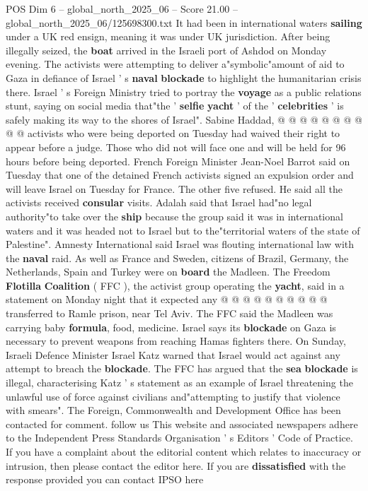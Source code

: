 \begin{textsample}{POS Dim 6 – global\_north\_2025\_06 – Score 21.00 – global\_north\_2025\_06/125698300.txt}
It had been in international waters \textbf{sailing} under a UK red ensign, meaning it was under UK jurisdiction.
After being illegally seized, the \textbf{boat} arrived in the Israeli port of Ashdod on Monday evening.
The activists were attempting to deliver a"symbolic"amount of aid to Gaza in defiance of Israel ' s \textbf{naval} \textbf{blockade} to highlight the humanitarian crisis there.
Israel ' s Foreign Ministry tried to portray the \textbf{voyage} as a public relations stunt, saying on social media that"the ' \textbf{selfie} \textbf{yacht} ' of the ' \textbf{celebrities} ' is safely making its way to the shores of Israel".
Sabine Haddad, @ @ @ @ @ @ @ @ @ @ activists who were being deported on Tuesday had waived their right to appear before a judge.
Those who did not will face one and will be held for 96 hours before being deported.
French Foreign Minister Jean-Noel Barrot said on Tuesday that one of the detained French activists signed an expulsion order and will leave Israel on Tuesday for France.
The other five refused.
He said all the activists received \textbf{consular} visits.
Adalah said that Israel had"no legal authority"to take over the \textbf{ship} because the group said it was in international waters and it was headed not to Israel but to the"territorial waters of the state of Palestine".
Amnesty International said Israel was flouting international law with the \textbf{naval} raid.
As well as France and Sweden, citizens of Brazil, Germany, the Netherlands, Spain and Turkey were on \textbf{board} the Madleen.
The Freedom \textbf{Flotilla} \textbf{Coalition} ( FFC ), the activist group operating the \textbf{yacht}, said in a statement on Monday night that it expected any @ @ @ @ @ @ @ @ @ @ transferred to Ramle prison, near Tel Aviv.
The FFC said the Madleen was carrying baby \textbf{formula}, food, medicine.
Israel says its \textbf{blockade} on Gaza is necessary to prevent weapons from reaching Hamas fighters there.
On Sunday, Israeli Defence Minister Israel Katz warned that Israel would act against any attempt to breach the \textbf{blockade}.
The FFC has argued that the \textbf{sea} \textbf{blockade} is illegal, characterising Katz ' s statement as an example of Israel threatening the unlawful use of force against civilians and"attempting to justify that violence with smears".
The Foreign, Commonwealth and Development Office has been contacted for comment. follow us This website and associated newspapers adhere to the Independent Press Standards Organisation ' s Editors ' Code of Practice.
If you have a complaint about the editorial content which relates to inaccuracy or intrusion, then please contact the editor here.
If you are \textbf{dissatisfied} with the response provided you can contact IPSO here

\end{textsample}
